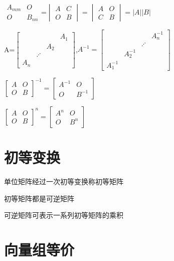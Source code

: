 \documentclass[UTF8]{ctexart}
\begin{document}
$\begin{array}{|cc|}
A_{mm} & O\\
O & B_{nn}
\end{array}$=$\begin{vmatrix}A & C\\
O & B
\end{vmatrix}=\begin{vmatrix}A & O\\
C & B
\end{vmatrix}=|A||B|$

A=$\begin{bmatrix} &  &  & A_{1}\\
 &  & A_{2}\\
 & \iddots\\
A_{n}
\end{bmatrix}$,$A^{-1}=\begin{bmatrix} &  &  & A_{n}^{-1}\\
 &  & \iddots\\
 & A_{2}^{-1}\\
A_{1}^{-1}
\end{bmatrix}$

$\begin{bmatrix}A & O\\
O & B
\end{bmatrix}^{-1}=\begin{bmatrix}A^{-1} & O\\
O & B^{-1}
\end{bmatrix}$

$\begin{bmatrix}A & O\\
O & B
\end{bmatrix}^{n}=\begin{bmatrix}A^{n} & O\\
O & B^{n}
\end{bmatrix}$

\section{初等变换}

单位矩阵经过一次初等变换称初等矩阵

初等矩阵都是可逆矩阵

可逆矩阵可表示一系列初等矩阵的乘积

\section{向量组等价}
\end{document}
